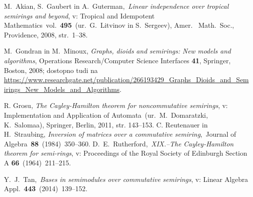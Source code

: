 \documentclass[mat1]{fmfdelo}
\begin{document}
\begin{thebibliography}{99}

	 M.~Akian, S.~Gaubert in A.~Guterman,~\emph{Linear independence over tropical semirings and beyond}, v: Tropical and Idempotent Mathematics~vol.~\textbf{495}~(ur.\ G.~Litvinov in S.~Sergeev), Amer. \ Math.\ Soc., Providence, 2008, str.\ 1--38.
	
	 M.~Gondran in M.~Minoux, \emph{Graphs, dioids and semirings: New models and algorithms}, Operations Research/Computer Science Interfaces \textbf{41}, Springer, Boston, 2008; dostopno tudi na \url{https://www.researchgate.net/publication/266193429_Graphs_Dioids_and_Semirings_New_Models_and_Algorithms}.
	
	 R. Grosu, \emph{The Cayley-Hamilton theorem for noncommutative semirings}, v: Implementation and Application of Automata~(ur.\ M.~Domaratzki, K.~Salomaa), Springer, Berlin, 2011, str. 143--153.
	 C. Reutenauer in H.~Straubing, \emph{Inversion of matrices over a commutative semiring},~Journal of Algebra~\textbf{88}~(1984)~350--360.	
	 D.~E.~Rutherford,~\emph{XIX.--The Cayley-Hamilton theorem for semi-rings}, v: Proceedings of the Royal Society of Edinburgh Section A \textbf{66}~(1964)~211--215.

	 Y.\ J.\ Tan,~\emph{Bases in semimodules over commutative semirings}, v: Linear Algebra Appl.~\textbf{443}~(2014)~139--152.
	
	
	
	
\end{thebibliography}
\end{document}
